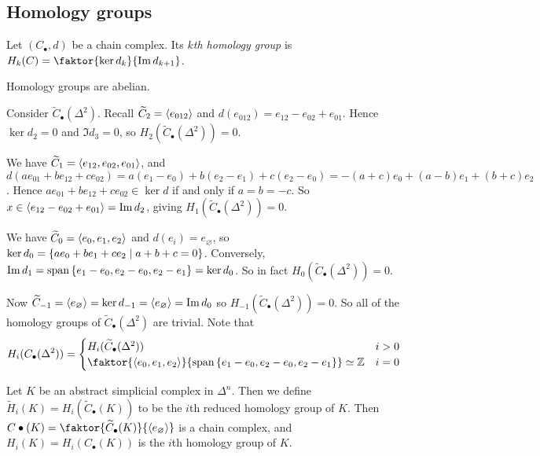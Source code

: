 \subsection{Homology groups}
\begin{definition}
	Let \( (C_\bullet, d) \) be a chain complex.
	Its \emph{\( k \)th homology group} is \( H_k(C) = \faktor{\ker d_k}{\Im d_{k+1}} \).
\end{definition}
\begin{remark}
	Homology groups are abelian.
\end{remark}
\begin{example}
	Consider \( \widetilde C_\bullet(\Delta^2) \).
	Recall \( \widetilde C_2 = \left\langle{} e_{012} \right\rangle \) and \( d(e_{012}) = e_{12} - e_{02} + e_{01} \).
	Hence \( \ker d_2 = 0 \) and \( \Im d_3 = 0 \), so \( H_2(\widetilde C_\bullet(\Delta^2)) = 0 \).

	We have \( \widetilde C_1 = \left\langle{} e_{12}, e_{02}, e_{01} \right\rangle \), and \( d(ae_{01} + be_{12} + ce_{02}) = a(e_1 - e_0) + b(e_2 - e_1) + c(e_2 - e_0) = -(a+c)e_0 + (a-b)e_1 + (b+c)e_2 \).
	Hence \( ae_{01} + be_{12} + ce_{02} \in \ker d \) if and only if \( a = b = -c \).
	So \( x \in \left\langle{} e_{12} - e_{02} + e_{01} \right\rangle = \Im d_2 \), giving \( H_1(\widetilde C_\bullet(\Delta^2)) = 0 \).

	We have \( \widetilde C_0 = \left\langle{} e_0, e_1, e_2 \right\rangle \) and \( d(e_i) = e_\varnothing \), so \( \ker d_0 = \qty{a e_0 + b e_1 + c e_2 \mid a + b + c = 0} \).
	Conversely, \( \Im d_1 = \operatorname{span}\qty{e_1 - e_0, e_2 - e_0, e_2 - e_1} = \ker d_0 \).
	So in fact \( H_0(\widetilde C_\bullet(\Delta^2)) = 0 \).

	Now \( \widetilde C_{-1} = \left\langle{} e_\varnothing \right\rangle = \ker d_{-1} = \left\langle{} e_\varnothing \right\rangle = \Im d_0 \) so \( H_{-1}(\widetilde C_\bullet(\Delta^2)) = 0 \).
	So all of the homology groups of \( \widetilde C_\bullet(\Delta^2) \) are trivial.
	Note that
	\[ H_i(C_\bullet(\Delta^2)) = \begin{cases}
		H_i(\widetilde C_\bullet(\Delta^2)) & i > 0 \\
		\faktor{\genset{e_0, e_1, e_2}}{\vecspan\qty{e_1 - e_0, e_2 - e_0, e_2 - e_1}} \simeq \mathbb Z & i = 0
	\end{cases} \]
\end{example}
\begin{definition}
	Let \( K \) be an abstract simplicial complex in \( \Delta^n \).
	Then we define \( \widetilde H_i(K) = H_i(\widetilde C_\bullet(K)) \) to be the \( i \)th reduced homology group of \( K \).
	Then \( C\bullet(K) = \faktor{\widetilde C_\bullet(K)}{\genset{e_\varnothing}} \) is a chain complex, and \( H_i(K) = H_i(C_\bullet(K)) \) is the \( i \)th homology group of \( K \).
\end{definition}
